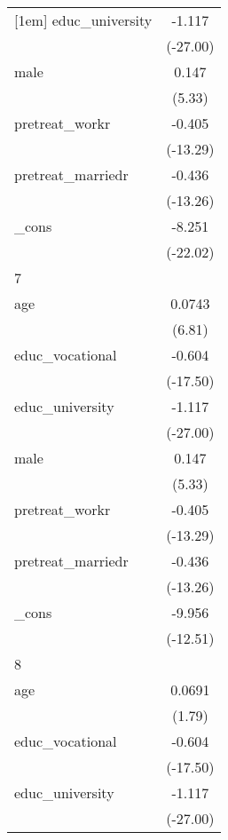 {\begin{tabular}{l*{1}{c}}
[1em]
educ\_university&      -1.117\sym{***}\\
            &    (-27.00)         \\
[1em]
male        &       0.147\sym{***}\\
            &      (5.33)         \\
[1em]
pretreat\_workr&      -0.405\sym{***}\\
            &    (-13.29)         \\
[1em]
pretreat\_marriedr&      -0.436\sym{***}\\
            &    (-13.26)         \\
[1em]
\_cons      &      -8.251\sym{***}\\
            &    (-22.02)         \\
\hline
7           &                     \\
age         &      0.0743\sym{***}\\
            &      (6.81)         \\
[1em]
educ\_vocational&      -0.604\sym{***}\\
            &    (-17.50)         \\
[1em]
educ\_university&      -1.117\sym{***}\\
            &    (-27.00)         \\
[1em]
male        &       0.147\sym{***}\\
            &      (5.33)         \\
[1em]
pretreat\_workr&      -0.405\sym{***}\\
            &    (-13.29)         \\
[1em]
pretreat\_marriedr&      -0.436\sym{***}\\
            &    (-13.26)         \\
[1em]
\_cons      &      -9.956\sym{***}\\
            &    (-12.51)         \\
\hline
8           &                     \\
age         &      0.0691         \\
            &      (1.79)         \\
[1em]
educ\_vocational&      -0.604\sym{***}\\
            &    (-17.50)         \\
[1em]
educ\_university&      -1.117\sym{***}\\
            &    (-27.00)         \\
[1em]

\end{tabular}}
